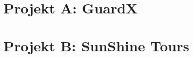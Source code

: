 \documentclass[fontsize=12pt,BCOR=5mm,DIV=15,parskip=half,listof=totoc,
               paper=a4,toc=bibliography,pointlessnumbers]{scrreprt}
\begin{document}

\normalfont

\tableofcontents
\cleardoublepage

{}
\listoffigures
\enlargethispage{3\baselineskip}
\begingroup
  \let\clearpage\relax
  \let\cleardoublepage\relax
  \vspace{0.5\baselineskip}
  \listoftables
  \vspace{0.5\baselineskip}
  \lstlistoflistings
  \vspace{0.5\baselineskip}
  
\endgroup
\cleardoublepage

\onehalfspacing

\clearpage
\ihead{\chaptername~\thechapter}



\part{Projekt A: GuardX}
\let\svdclearpage\clearpage
\let\svdcleardoublepage\cleardoublepage
\let\clearpage\relax
\let\cleardoublepage\relax

\let\clearpage\svdclearpage
\let\cleardoublepage\svdcleardoublepage







\part{Projekt B: SunShine Tours}
\let\svdclearpage\clearpage
\let\svdcleardoublepage\cleardoublepage
\let\clearpage\relax
\let\cleardoublepage\relax


\let\clearpage\svdclearpage
\let\cleardoublepage\svdcleardoublepage






\singlespacing

\ihead{}
\printbibliography
\cleardoublepage
\end{document}
